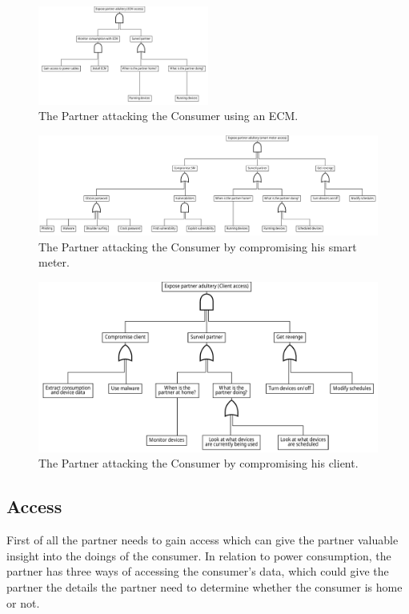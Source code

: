 \begin{figure}[h]
  \centering
  \includegraphics[width=0.5\textwidth]{figures/graphviz/partner_vs_consumer_ecm.pdf}
  \caption{The Partner attacking the Consumer using an ECM.}
  \label{fig:attack_trees:partner:cheater_ecm}
\end{figure}

\begin{figure}[h]
  \centering
  \includegraphics[angle=90,height=\textheight]{figures/graphviz/partner_vs_consumer_sm.pdf}
  \caption{The Partner attacking the Consumer by compromising his smart meter.}
  \label{fig:attack_trees:partner:cheater_sm}
\end{figure}

\begin{figure}[h]
  \includegraphics[width=\textwidth]{figures/graphviz/partner_vs_consumer_client.pdf}
  \caption{The Partner attacking the Consumer by compromising his client.}
  \label{fig:attack_trees:partner:cheater_client}
\end{figure}


\subsection{Access}
First of all the partner needs to gain access which can give the partner valuable insight into the doings of the consumer.
In relation to power consumption, the partner has three ways of accessing the consumer's data, which could give the partner the details the partner need to determine whether the consumer is home or not.

